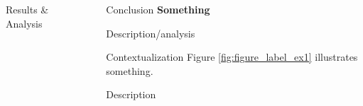 \documentclass[final]{beamer}
\newlength{\sepwid}
\newlength{\onecolwid}
\newlength{\threecolwid}
\begin{document}
\begin{frame}[t]
\begin{columns}[t,totalwidth=\threecolwid]
\begin{column}{\onecolwid}
\begin{block}{Results \& Analysis}






\end{block}



\end{column} %

\begin{column}{\sepwid}\end{column} %

\begin{column}{\onecolwid} %

\begin{block}{Conclusion}
\textbf{Something}

Description/analysis
 
Contextualization
Figure \ref{fig:figure_label_ex1} illustrates something.

Description


\end{block}
\end{column}
\end{columns}
\end{frame}
\end{document}

